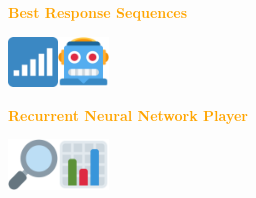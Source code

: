 \documentclass{beamer}
\begin{document}
\begin{frame}
    \begin{center}
    \textcolor{orange}{\large{\textbf{Best Response Sequences}}} \vspace{1cm}

    \includegraphics[width=0.10\textwidth]{static/sequence.png}\hspace{2pt}\includegraphics[width=0.10\textwidth]{static/lstm.png}
    \end{center}
\end{frame}

\begin{frame}
    \begin{center}
    
    \end{center}
\end{frame}


\begin{frame}
    \begin{center}
    
    \end{center}
\end{frame}

\begin{frame}
    \begin{center}
    
    \end{center}
\end{frame}
\begin{frame}
    \begin{center}
        \textcolor{orange}{\large{\textbf{Recurrent Neural Network Player}}} \vspace{1cm}
    
        \includegraphics[width=0.10\textwidth]{static/look.png}\hspace{2pt}\includegraphics[width=0.10\textwidth]{static/bar.png}
    \end{center}
\end{frame}
\end{document}
